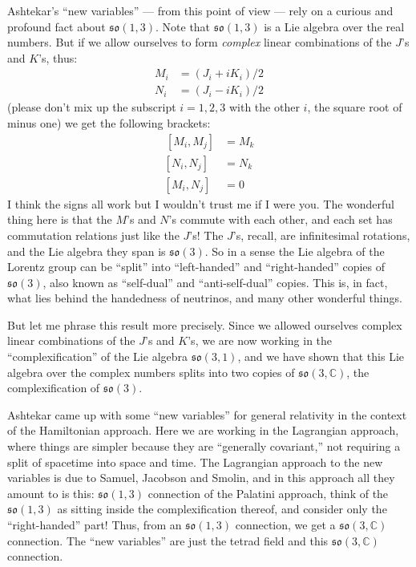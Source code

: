 \documentclass{article}
\begin{document}
Ashtekar's ``new variables'' --- from this point of view --- rely on a
curious and profound fact about \(\mathfrak{so}(1,3)\). Note that
\(\mathfrak{so}(1,3)\) is a Lie algebra over the real numbers. But if we
allow ourselves to form \emph{complex} linear combinations of the
\(J\)'s and \(K\)'s, thus:
\[\begin{aligned}M_i &= (J_i + iK_i)/2 \\ N_i &= (J_i -iK_i)/2\end{aligned}\]
(please don't mix up the subscript \(i = 1,2,3\) with the other \(i\),
the square root of minus one) we get the following brackets:
\[\begin{aligned}\,[M_i,M_j] &= M_k \\ [N_i,N_j] &= N_k \\ [M_i,N_j] &= 0\end{aligned}\]
I think the signs all work but I wouldn't trust me if I were you. The
wonderful thing here is that the \(M\)'s and \(N\)'s commute with each
other, and each set has commutation relations just like the \(J\)'s! The
\(J\)'s, recall, are infinitesimal rotations, and the Lie algebra they
span is \(\mathfrak{so}(3)\). So in a sense the Lie algebra of the
Lorentz group can be ``split'' into ``left-handed'' and ``right-handed''
copies of \(\mathfrak{so}(3)\), also known as ``self-dual'' and
``anti-self-dual'' copies. This is, in fact, what lies behind the
handedness of neutrinos, and many other wonderful things.

But let me phrase this result more precisely. Since we allowed ourselves
complex linear combinations of the \(J\)'s and \(K\)'s, we are now
working in the ``complexification'' of the Lie algebra
\(\mathfrak{so}(3,1)\), and we have shown that this Lie algebra over the
complex numbers splits into two copies of
\(\mathfrak{so}(3,\mathbb{C})\), the complexification of
\(\mathfrak{so}(3)\).

Ashtekar came up with some ``new variables'' for general relativity in
the context of the Hamiltonian approach. Here we are working in the
Lagrangian approach, where things are simpler because they are
``generally covariant,'' not requiring a split of spacetime into space
and time. The Lagrangian approach to the new variables is due to Samuel,
Jacobson and Smolin, and in this approach all they amount to is this:
\(\mathfrak{so}(1,3)\) connection of the Palatini approach, think of the
\(\mathfrak{so}(1,3)\) as sitting inside the complexification thereof,
and consider only the ``right-handed'' part! Thus, from an
\(\mathfrak{so}(1,3)\) connection, we get a
\(\mathfrak{so}(3,\mathbb{C})\) connection. The ``new variables'' are
just the tetrad field and this \(\mathfrak{so}(3,\mathbb{C})\)
connection.
\end{document}
